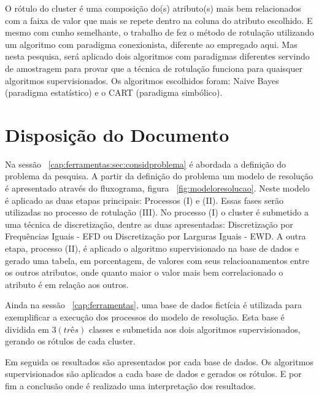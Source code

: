 O rótulo do cluster é uma composição do(s) atributo(s) mais bem relacionados com a faixa de valor que mais se repete dentro na coluna do atributo escolhido. E mesmo com cunho semelhante, o trabalho de \cite{Lopes} fez o método de rotulação utilizando um algoritmo com paradigma conexionista, diferente ao empregado aqui. Mas nesta pesquisa, será aplicado dois algoritmos com paradigmas diferentes servindo de amostragem para provar que a técnica de rotulação funciona para quaisquer algoritmos supervisionados. Os algoritmos escolhidos foram: Naive Bayes (paradigma estatístico) e o CART (paradigma simbólico).

\section*{Disposição do Documento}
Na sessão ~\ref{cap:ferramentas:sec:considproblema} é abordada a definição do problema da pesquisa. A partir da definição do problema um modelo de resolução é apresentado através do fluxograma, figura ~\ref{fig:modeloresolucao}. Neste modelo é aplicado as duas etapas principais: Processos (I) e (II). Essas fases serão utilizadas no processo de rotulação (III). No processo (I)  o cluster é submetido a uma técnica de discretização, dentre as duas apresentadas: Discretização por Frequências Iguais - EFD ou Discretização por Larguras Iguais - EWD. A outra etapa, processo (II), é aplicado o algoritmo supervisionado na base de dados e gerado uma tabela, em porcentagem, de valores com seus relacioanamentos entre os outros atributos, onde quanto maior o valor mais bem correlacionado o atributo é em relação aos outros.

Ainda na sessão ~\ref{cap:ferramentas}, uma base de dados fictícia é utilizada para exemplificar a execução dos processos do modelo de resolução. Esta base é dividida em ${3(três)}$ classes e submetida aos dois algoritmos supervisionados, gerando os rótulos de cada cluster.

Em seguida os resultados são apresentados por cada base de dados. Os algoritmos supervisionados são aplicados a cada base de dados e gerados os rótulos. E por fim a conclusão onde é realizado uma interpretação dos resultados.




